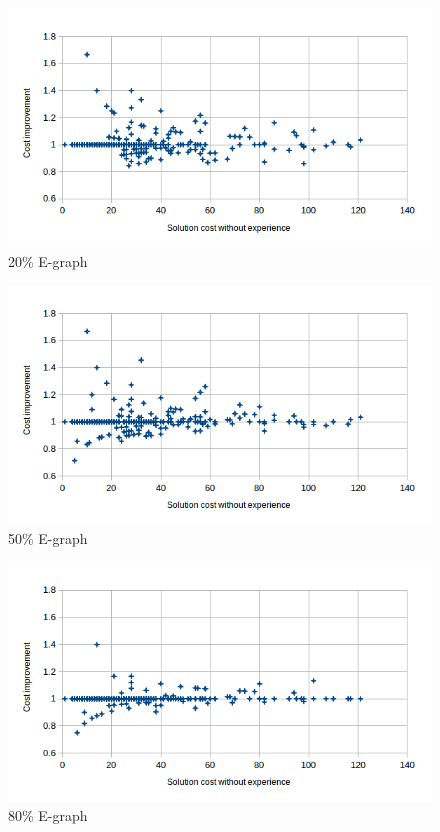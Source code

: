 \documentclass[letterpaper]{article}
\begin{document}
\begin{figure}
	\begin{center}
	\includegraphics[scale=0.5]{Cost_20_0.png}
	\end{center}
	\caption{20\% E-graph}
	 \label{fig:c_20_0}
\end{figure}

\begin{figure}
	\begin{center}
	\includegraphics[scale=0.5]{Cost_50_0.png}
	\end{center}
	\caption{50\% E-graph}
	 \label{fig:c_50_0}
\end{figure}

\begin{figure}
	\begin{center}
	\includegraphics[scale=0.5]{Cost_80_0.png}
	\end{center}
	\caption{80\% E-graph}
	 \label{fig:c_80_0}
\end{figure}
\end{document}
